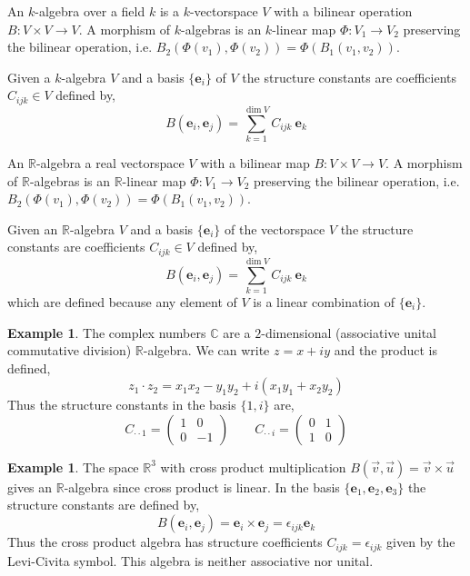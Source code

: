 \documentclass[12pt]{extarticle}
\newcommand{\R}{\mathbb{R}}
\theoremstyle{definition}
\newtheorem{example}[theorem]{Example}
\newenvironment{definition}[1][Definition:]{\begin{trivlist}
\item[\hskip \labelsep {\bfseries #1}]}{\end{trivlist}}
\renewcommand{\bf}[1]{\mathbf{#1}}
\newcommand{\C}{\mathbb{C}}
\begin{document}
\begin{definition}
An $k$-algebra over a field $k$ is a $k$-vectorspace $V$ with a bilinear operation $B : V \times V \to V$. A morphism of $k$-algebras is an $k$-linear map $\Phi : V_1 \to V_2$ preserving the bilinear operation, i.e. $B_2(\Phi(v_1), \Phi(v_2)) = \Phi(B_1(v_1, v_2))$. 
\end{definition}

\begin{definition}
Given a $k$-algebra $V$ and a basis $\{ \bf{e}_i \}$ of $V$ the structure constants are coefficients $C_{ijk} \in V$ defined by,
\[ B(\bf{e}_i, \bf{e}_j) = \sum_{k = 1}^{\dim{V}} C_{ijk} \: \bf{e}_k \] 
\end{definition}

\fi

\begin{definition}
An $\R$-algebra a real vectorspace $V$ with a bilinear map $B : V \times V \to V$. A morphism of $\R$-algebras is an $\R$-linear map $\Phi : V_1 \to V_2$ preserving the bilinear operation, i.e. $B_2(\Phi(v_1), \Phi(v_2)) = \Phi(B_1(v_1, v_2))$. 
\end{definition}

\begin{definition}
Given an $\R$-algebra $V$ and a basis $\{ \bf{e}_i \}$ of the vectorspace $V$ the structure constants are coefficients $C_{ijk} \in V$ defined by,
\[ B(\bf{e}_i, \bf{e}_j) = \sum_{k = 1}^{\dim{V}} C_{ijk} \: \bf{e}_k \] 
which are defined because any element of $V$ is a linear combination of $\{ \bf{e}_i \}$. 
\end{definition}

\begin{example}
The complex numbers $\C$ are a $2$-dimensional (associative unital commutative division) $\R$-algebra. We can write $z = x + i y$ and the product is defined,
\[ z_1 \cdot z_2 = x_1 x_2 - y_1 y_2 + i (x_1 y_1 + x_2 y_2)  \]
Thus the structure constants in the basis $\{ 1, i \}$ are,
\[ C_{\cdot \cdot 1} = \begin{pmatrix}
1 & 0
\\
0 & -1
\end{pmatrix} \quad \quad C_{\cdot \cdot i} = \begin{pmatrix}
0 & 1
\\
1 & 0
\end{pmatrix}  \]
\end{example}

\begin{example}
The space $\R^3$ with cross product multiplication $B(\vec{v}, \vec{u}) = \vec{v} \times \vec{u}$ gives an $\R$-algebra since cross product is linear. In the basis $\{ \bf{e}_1, \bf{e}_2, \bf{e}_3 \}$ the structure constants are defined by,
\[ B(\bf{e}_i, \bf{e}_j) = \bf{e}_i \times \bf{e}_j  = \epsilon_{ijk} \bf{e}_k \]
Thus the cross product algebra has structure coefficients $C_{ijk} = \epsilon_{ijk}$ given by the Levi-Civita symbol.  
This algebra is neither associative nor unital. 
\end{example}
\end{document}
